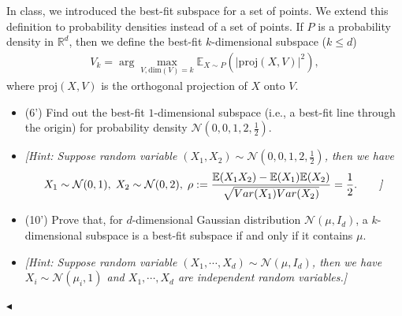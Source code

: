 ﻿\documentclass[11pt]{article}
\newenvironment{problem}[2][Problem]{\begin{trivlist}
\item[\hskip \labelsep {\bfseries #1}\hskip \labelsep {\bfseries #2.}]}{\hfill$\blacktriangleleft$\end{trivlist}}
\newcommand\E{\mathbb{E}}
\begin{document}
\begin{problem}{6 (16')}
In class, we introduced the best-fit subspace for a set of points. We extend this definition to probability densities instead of a set of points. If $P$ is a probability density in $\mathbb{R}^d$, then we define the best-fit $k$-dimensional subspace ($k\leq d$)
\begin{align*}
V_k=\arg\max_{V,\mathrm{dim}(V)=k}\E_{X\sim P}(|\mathrm{proj}(X,V)|^2),
\end{align*}
where $\mathrm{proj}(X,V)$ is the orthogonal projection of $X$ onto $V$.
\begin{itemize}
    \item [(1)] (6') Find out the best-fit $1$-dimensional subspace (i.e., a best-fit line through the origin) for probability density $\mathcal{N}\left(0,0,1,2,\frac{1}{2}\right)$.
    \item [] \textit{[Hint: Suppose random variable $(X_1,X_2)\sim\mathcal{N}\left(0,0,1,2,\frac{1}{2}\right)$, then we have}
    \begin{align*}
        X_1\sim\mathcal{N}(0,1),\;X_2\sim\mathcal{N}(0,2),\;\rho:=\frac{\mathbb{E}(X_1X_2)-\mathbb{E}(X_1)\mathbb{E}(X_2)}{\sqrt{Var(X_1)Var(X_2)}}=\frac12.\tag*{\textit{]}}
    \end{align*}
    \item [(2)] (10') Prove that, for $d$-dimensional Gaussian distribution $\mathcal{N}(\mu,I_d)$, a $k$-dimensional subspace is a best-fit subspace if and only if it contains $\mu$.
    \item [] \textit{[Hint: Suppose random variable $(X_1,\cdots,X_d)\sim\mathcal{N}(\mu,I_d)$, then we have $X_i\sim\mathcal{N}(\mu_i,1)$ and $X_1,\cdots,X_d$ are independent random variables.]}
\end{itemize}
\end{problem}
\end{document}
